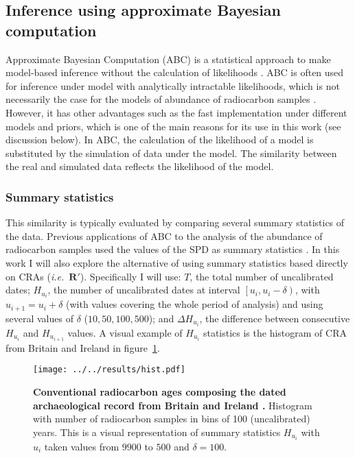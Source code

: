 \documentclass[a4paper]{article}
\begin{document}
\subsection*{Inference using approximate Bayesian computation}

Approximate Bayesian Computation (ABC) is a statistical approach to make model-based inference without the calculation of likelihoods \parencite[see][for a review]{Sunnaker2013}. ABC is often used for inference under model with analytically intractable likelihoods, which is not necessarily the case for the models of abundance of radiocarbon samples \parencite[\emph{e.g.}][]{Crema2021b}. However, it has other advantages such as the fast implementation under different models and priors, which is one of the main reasons for its use in this work (see discussion below). In ABC, the calculation of the likelihood of a model is substituted by the simulation of data under the model. The similarity between the real and simulated data reflects the likelihood of the model.
\\

\subsubsection*{Summary statistics}

This similarity is typically evaluated by comparing several summary statistics of the data. Previous applications of ABC to the analysis of the abundance of radiocarbon samples used the values of the SPD as summary statistics \parencite{Porcic2020,DiNapoli2021}. In this work I will also explore the alternative of using summary statistics based directly on CRAs (\emph{i.e.}\ $\bm{R}'$). Specifically I will use: $T$, the total number of uncalibrated dates; $H_{u_i}$, the number of uncalibrated dates at interval $\left[u_i, u_i-\delta\right)$, with $u_{i+1}=u_i+\delta$ (with values covering the whole period of analysis) and using several values of $\delta$ ($10, 50, 100, 500$); and $\Delta H_{u_i}$, the difference between consecutive $H_{u_i}$ and $H_{u_{i+1}}$ values. A visual example of $H_{u_i}$ statistics is the histogram of CRA from Britain and Ireland in figure~\ref{fig:data}.
\\


\begin{figure}
\center\texttt{[image: ../../results/hist.pdf]}
\caption{\textbf{Conventional radiocarbon ages composing the dated archaeological record from Britain and Ireland \parencite{Bevan2017a}.} Histogram with number of radiocarbon samples in bins of 100 (uncalibrated) years. This is a visual representation of summary statistics $H_{u_i}$ with $u_i$ taken values from $9900$ to $500$ and $\delta=100$.}
\label{fig:data}
\end{figure}
\end{document}
